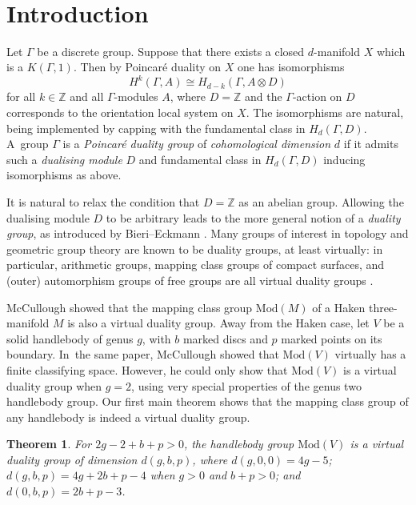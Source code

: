 \documentclass[JEP,XML,SOM,Unicode,NoFloatCountersInSection,published]{cedram}
\theoremstyle{plain}
\newtheorem{thmA}{Theorem}
\theoremstyle{definition}
\newcommand{\Z}{\mathbb Z}
\newcommand{\mcg}{\mathrm{Mod}}
\newcommand{\hmod}{\mathrm{Mod}}
\begin{document}
\vspace*{-3\baselineskip}
\mbox{ }
\section{Introduction}
Let $\Gamma$ be a discrete group. Suppose that there exists a closed $d$-manifold $X$ which is a $K(\Gamma,1)$. Then by Poincaré duality on $X$ one has isomorphisms
\[
H^k(\Gamma,A) \cong H_{d-k}(\Gamma, A\otimes D)
\]
for all $k \in \Z$ and all $\Gamma$-modules $A$, where $D=\mathbb{Z}$ and the $\Gamma$-action on $D$ corresponds to the orientation local system on $X$. The isomorphisms are natural, being implemented by capping with the fundamental class in $H_d(\Gamma,D)$. A~group $\Gamma$ is a \emph{Poincaré duality group} of \emph{cohomological dimension} $d$ if it admits such a \emph{dualising module} $D$ and fundamental class in $H_d(\Gamma,D)$ inducing isomorphisms as above.

It is natural to relax the condition that $D=\mathbb{Z}$ as an abelian group. Allowing the dualising module $D$ to be arbitrary leads to the more general notion of a \emph{duality group}, as introduced by Bieri--Eckmann \cite{be}. Many groups of interest in topology and geometric group theory are known to be duality groups, at least virtually: in particular, arithmetic groups, mapping class groups of compact surfaces, and (outer) automorphism groups of free groups are all virtual duality groups \cite{borelserre,harer,bestvinafeighn}.

McCullough \cite{mccullough} showed that the mapping class group $\mcg(M)$ of a Haken three-manifold $M$ is also a virtual duality group. Away from the Haken case, let $V$ be a solid handlebody of genus $g$, with $b$ marked discs and $p$ marked points on its boundary. In~the same paper, McCullough showed that $\mcg(V)$ virtually has a finite classifying space. However, he could only show that $\mcg(V)$ is a virtual duality group when $g=2$, using very special properties of the genus two handlebody group. Our first main theorem shows that the mapping class group of any handlebody is indeed a virtual duality group.

\begin{thmA}\label{thm:A}
For $2g -2+ b +p > 0$, the handlebody group $\hmod(V)$ is a virtual duality
group of dimension $d(g, b, p)$, where $d(g, 0 , 0 ) = 4 g - 5 $; $d(g , b , p ) = 4 g + 2 b + p - 4$ when $g > 0$ and $b + p > 0$; and $d(0,b,p)=2b + p - 3$.
\end{thmA}
\end{document}
